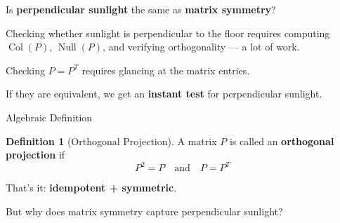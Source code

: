 \documentclass[10pt]{beamer}
\theoremstyle{definition}
\newtheorem{defi}{Definition}[section]
\newcommand{\x}[1]{\alert{\textbf{#1}}}
\begin{document}
\begin{frame}{}

\vspace{2em}

\begin{center}
{\Large Is \x{perpendicular sunlight} the same as \x{matrix symmetry}?}
\end{center}

\vspace{2em}

{\small
Checking whether sunlight is perpendicular to the floor requires computing $\operatorname{Col}(P)$, $\operatorname{Null}(P)$, and verifying orthogonality --- a lot of work.

\vspace{0.3em}

Checking $P = P^T$ requires glancing at the matrix entries.

\vspace{0.3em}

If they are equivalent, we get an \x{instant test} for perpendicular sunlight.
}

\end{frame}

\begin{frame}{Algebraic Definition}

\begin{defi}[Orthogonal Projection]
A matrix $P$ is called an \x{orthogonal projection} if
$$P^2 = P \quad\text{and}\quad P = P^T$$
\end{defi}

\vspace{1em}

That's it: \x{idempotent + symmetric}.

\vspace{1em}

But why does matrix symmetry capture perpendicular sunlight?

\end{frame}
\end{document}
